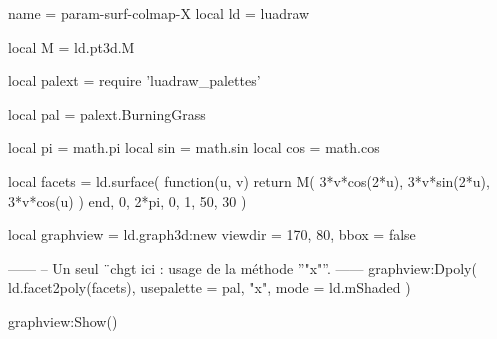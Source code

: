 \documentclass[border = 3pt]{standalone}
\begin{document}
\begin{luadraw*}{name = param-surf-colmap-X}
local ld = luadraw

local M = ld.pt3d.M

local palext = require 'luadraw_palettes'

local pal = palext.BurningGrass

local pi  = math.pi
local sin = math.sin
local cos = math.cos

local facets = ld.surface(
  function(u, v)
    return M(
      3*v*cos(2*u),
      3*v*sin(2*u),
      3*v*cos(u)
    )
  end,
  0, 2*pi, 0, 1,
  {50, 30}
)

local graphview = ld.graph3d:new{
  viewdir = {170, 80},
  bbox    = false
}

------
-- Un seul ¨chgt ici : usage de la méthode ''"x"''.
------
graphview:Dpoly(
  ld.facet2poly(facets),
  {
    usepalette = {pal, "x"},
    mode       = ld.mShaded
  }
)

graphview:Show()
\end{luadraw*}
\end{document}

